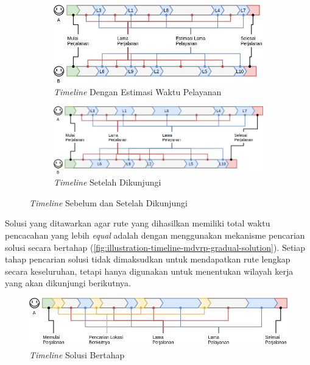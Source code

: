 \begin{figure}[!]
	\centering
	\begin{subfigure}[t]{12.5cm}
		\centering
		\includegraphics[width=\textwidth]{Resources/Images/illustration-timeline-mdvrp-timeservice-estimation}
		\caption{\textit{Timeline} Dengan Estimasi Waktu Pelayanan}
		\label{fig:illustration-timeline-mdvrp-timeservice-estimation}
	\end{subfigure}%
	
	\begin{subfigure}[t]{\textwidth}
		\centering
		\includegraphics[width=\textwidth]{Resources/Images/illustration-timeline-mdvrp-timeservice-real}
		\caption{\textit{Timeline} Setelah Dikunjungi}
		\label{fig:illustration-timeline-mdvrp-timeservice-real}
	\end{subfigure}%
	\caption{\textit{Timeline} Sebelum dan Setelah Dikunjungi}
	\label{fig:illustration-timeline-mdvrp}
\end{figure}


Solusi yang ditawarkan agar rute yang dihasilkan memiliki total waktu pencacahan yang lebih \textit{equal} adalah dengan menggunakan mekanisme pencarian solusi secara bertahap (\autoref{fig:illustration-timeline-mdvrp-gradual-solution}). Setiap tahap pencarian solusi tidak dimaksudkan untuk mendapatkan rute lengkap secara keseluruhan, tetapi hanya digunakan untuk menentukan wilayah kerja yang akan dikunjungi berikutnya.


\begin{figure}[!]
	\centering
	\includegraphics[width=\textwidth]{Resources/Images/illustration-timeline-mdvrp-gradual-solution}
	\caption{\textit{Timeline} Solusi Bertahap}
	\label{fig:illustration-timeline-mdvrp-gradual-solution}
\end{figure}


